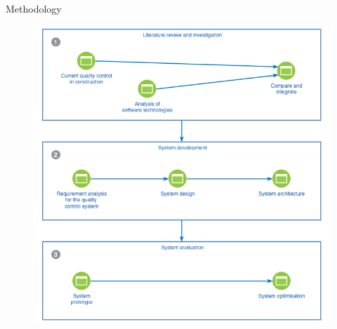 \documentclass{beamer}%
\begin{document}
\begin{frame}{Methodology}
\begin{changemargin}
\footnotesize



 \begin{figure}[h]
  \begin{minipage}[h]{0.65\linewidth}
  \hbox{\hspace{-0.1em}\includegraphics[width=\linewidth]{img/stages_of_research}}
  \end{minipage}
  \end{figure}


\end{changemargin}
\end{frame}
\end{document}
